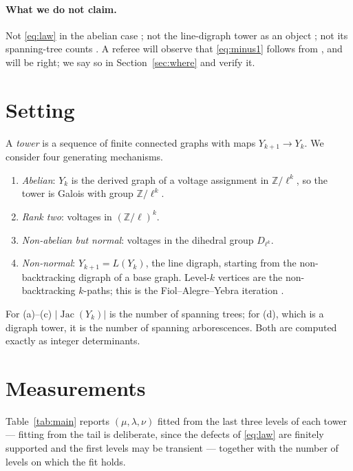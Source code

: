 \documentclass[11pt]{article}
\theoremstyle{plain}
\theoremstyle{remark}
\newcommand{\Z}{\mathbb{Z}}
\newcommand{\Jac}{\operatorname{Jac}}
\begin{document}
\paragraph{What we do not claim.}
Not \eqref{eq:law} in the abelian case \cite{Val21,MV24,Gonet22}; not the line-digraph
tower as an object \cite{FAY83,FYA84}; not its spanning-tree counts
\cite{Knuth67,Levine11,BK11,CHP15}. A referee will observe that \eqref{eq:minus1} follows
from \cite{Knuth67,Levine11}, and will be right; we say so in Section~\ref{sec:where} and
verify it.

\section{Setting}\label{sec:setting}

A \emph{tower} is a sequence of finite connected graphs with maps
$Y_{k+1}\to Y_k$. We consider four generating mechanisms.
\begin{enumerate}
\item[(a)] \emph{Abelian}: $Y_k$ is the derived graph of a voltage assignment in
$\Z/\ell^{k}$, so the tower is Galois with group $\Z/\ell^{k}$.
\item[(b)] \emph{Rank two}: voltages in $(\Z/\ell)^{k}$.
\item[(c)] \emph{Non-abelian but normal}: voltages in the dihedral group $D_{\ell^{k}}$.
\item[(d)] \emph{Non-normal}: $Y_{k+1}=L(Y_k)$, the line digraph, starting from the
non-backtracking digraph of a base graph. Level-$k$ vertices are the non-backtracking
$k$-paths; this is the Fiol--Alegre--Yebra iteration \cite{FAY83}.
\end{enumerate}
For (a)--(c) $|\Jac(Y_k)|$ is the number of spanning trees; for (d), which is a digraph
tower, it is the number of spanning arborescences. Both are computed exactly as integer
determinants.

\section{Measurements}\label{sec:measure}

Table~\ref{tab:main} reports $(\mu,\lambda,\nu)$ fitted from the last three levels of each
tower --- fitting from the tail is deliberate, since the defects of \eqref{eq:law} are
finitely supported \cite[IX]{ANCFT} and the first levels may be transient --- together with
the number of levels on which the fit holds.
\end{document}

